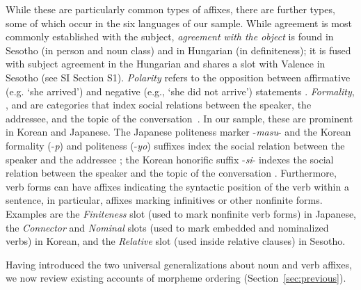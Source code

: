 \documentclass[man]{apa7}
\newcommand{\citep}{\parencite}
\newcommand\mhahn[1]{{\color{red}(#1)}}
\begin{document}
While these are particularly common types of affixes, there are further types, some of which occur in the six languages of our sample.
While agreement is most commonly established with the subject, \textit{agreement with the object} is found in Sesotho \citep{doke1967textbook} (in person and noun class) and in Hungarian \citep{rounds2001hungarian} (in definiteness); it is fused with subject agreement in the Hungarian and shares a slot with Valence in Sesotho (see SI Section S1).
\textit{Polarity} refers to the opposition between affirmative (e.g. `she arrived') and negative  (e.g., `she did not arrive') statements \citep{wals-112}.
\textit{Formality}, , and  are categories that index social relations between the speaker, the addressee, and the topic of the conversation~\citep{hasegawa2014japanese, yeon2010korean}.
In our sample, these are prominent in Korean and Japanese.
The Japanese politeness marker -\textit{masu}- and the Korean formality (-\textit{p}) and politeness (-\textit{yo}) suffixes index the social relation between the speaker and the addressee \citep{hasegawa2014japanese, yeon2010korean}; the Korean honorific suffix -\textit{si}- indexes the social relation between the speaker and the topic of the conversation \citep{yeon2010korean}.
Furthermore, verb forms can have affixes indicating the syntactic position of the verb within a sentence, in particular, affixes marking infinitives or other nonfinite forms.
Examples are the \textit{Finiteness} slot (used to mark nonfinite verb forms) in Japanese, the \textit{Connector} and \textit{Nominal} slots (used to mark embedded and nominalized verbs) in Korean, and the \textit{Relative} slot (used inside relative clauses) in Sesotho.


Having introduced the two universal generalizations about noun and verb affixes, we now review existing accounts of morpheme ordering (Section~\ref{sec:previous}).



\end{document}
